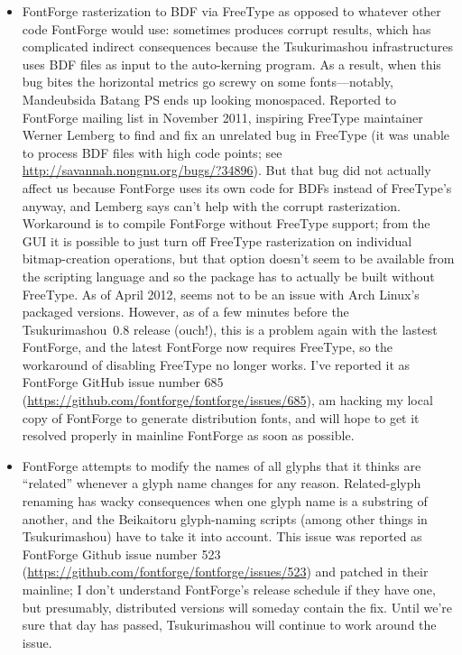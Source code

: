 \documentclass[14pt]{extarticle}
\begin{document}
\begin{itemize}
  \item FontForge rasterization to BDF via FreeType as opposed to whatever
    other code FontForge would use:  sometimes produces corrupt results,
    which has complicated indirect consequences because the Tsukurimashou
    infrastructures uses BDF files as input to the auto-kerning program.  As
    a result, when this bug bites the horizontal metrics go screwy on some
    fonts---notably, Mandeubsida Batang PS ends up looking monospaced. 
    Reported to FontForge mailing list in November 2011, inspiring FreeType
    maintainer Werner Lemberg to find and fix an unrelated bug in FreeType
    (it was unable to process BDF files with high code points; see
    \url{http://savannah.nongnu.org/bugs/?34896}).  But that bug did not
    actually affect us because FontForge uses its own code for BDFs instead
    of FreeType's anyway, and Lemberg says can't help with the corrupt
    rasterization.  Workaround is to compile FontForge without FreeType
    support; from the GUI it is possible to just turn off FreeType
    rasterization on individual bitmap-creation operations, but that option
    doesn't seem to be available from the scripting language and so the
    package has to actually be built without FreeType.  As of April 2012,
    seems not to be an issue with Arch Linux's packaged versions.  However,
    as of a few minutes before the Tsukurimashou~0.8 release (ouch!), this
    is a problem again with the lastest FontForge, and the latest FontForge
    now requires FreeType, so the workaround of disabling FreeType no longer
    works.  I've reported it as FontForge GitHub issue number 685
    (\url{https://github.com/fontforge/fontforge/issues/685}), am hacking my
    local copy of FontForge to generate distribution fonts, and will hope to
    get it resolved properly in mainline FontForge as soon as possible.

  \item FontForge attempts to modify the names of all glyphs that it thinks
    are ``related'' whenever a glyph name changes for any reason. 
    Related-glyph renaming has wacky consequences when one glyph name is a
    substring of another, and the Beikaitoru glyph-naming scripts (among
    other things in Tsukurimashou) have to take it into account.  This issue
    was reported as FontForge Github issue number 523
    (\url{https://github.com/fontforge/fontforge/issues/523}) and patched in
    their mainline; I don't understand FontForge's release schedule if they
    have one, but presumably, distributed versions will someday contain the
    fix.  Until we're sure that day has passed, Tsukurimashou will continue
    to work around the issue.


\end{itemize}
\end{document}
